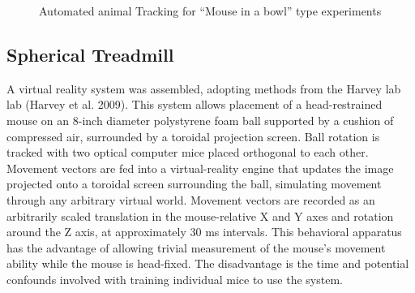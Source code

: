 \documentclass[
  12pt,
]{report}
\numberwithin{figure}{section}
\numberwithin{table}{section}
\numberwithin{equations}{section}
\begin{document}
\begin{figure}
\centering



\caption{Automated animal Tracking for ``Mouse in a bowl'' type
experiments}

\label{fig:mouse-in-a-bowl}

\end{figure}

\hypertarget{spherical-treadmill}{%
\subsection{Spherical Treadmill}\label{spherical-treadmill}}

A virtual reality system was assembled, adopting methods from the Harvey
lab lab (Harvey et al. 2009). This system allows placement of a
head-restrained mouse on an 8-inch diameter polystyrene foam ball
supported by a cushion of compressed air, surrounded by a toroidal
projection screen. Ball rotation is tracked with two optical computer
mice placed orthogonal to each other. Movement vectors are fed into a
virtual-reality engine that updates the image projected onto a toroidal
screen surrounding the ball, simulating movement through any arbitrary
virtual world. Movement vectors are recorded as an arbitrarily scaled
translation in the mouse-relative X and Y axes and rotation around the Z
axis, at approximately 30 ms intervals. This behavioral apparatus has
the advantage of allowing trivial measurement of the mouse's movement
ability while the mouse is head-fixed. The disadvantage is the time and
potential confounds involved with training individual mice to use the
system.
\end{document}
